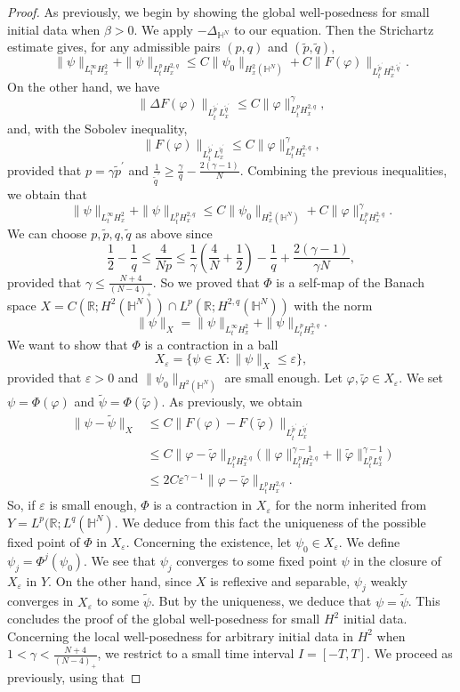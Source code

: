 \documentclass[10pt,leqno]{amsart}
\numberwithin{equation}{section}
\newcommand{\field}[1]{\mathbb{#1}}
\newcommand{\R}{\field{R}}          		%
\newcommand{\Hy}{\field{H}}
\begin{document}
\begin{proof}
As previously, we begin by showing the global well-posedness for small initial data when $\beta >0$. We apply $-\Delta_{\Hy^N}$ to our equation. Then the Strichartz estimate gives, for any admissible pairs $(p,q)$ and $(\tilde{p},\tilde{q})$,
$$\|\psi\|_{L_t^\infty H_x^2} +\|\psi \|_{L_t^p H_x^{2,q}}\leq C \|\psi_0 \|_{H^2_x (\Hy^N)}+C \|F(\varphi)\|_{L_t^{\tilde{p}^\prime} H_x^{2,\tilde{q}^\prime}}.  $$
On the other hand, we have
$$\|\Delta F(\varphi) \|_{L_t^{\tilde{p}^\prime} L_x^{\tilde{q}^\prime}} \leq C \|\varphi \|^\gamma_{L_t^p H_x^{2,q}},$$
and, with the Sobolev inequality,
$$ \| F(\varphi) \|_{L_t^{\tilde{p}^\prime} L_x^{\tilde{q}^\prime}} \leq C \|\varphi \|^\gamma_{L_t^p H_x^{2,q}},$$
provided that $p=\gamma \tilde{p}^\prime$ and $\frac{1}{\tilde{q}^\prime}\geq \frac{\gamma}{q} - \frac{2(\gamma -1)}{N}$. Combining the previous inequalities, we obtain that
$$\|\psi\|_{L_t^\infty H_x^2} +\|\psi \|_{L_t^p H_x^{2,q}}\leq C \|\psi_0\|_{H^2_x (\Hy^N)}+C \|\varphi\|^\gamma_{L_t^p H_x^{2,q}}.$$
We can choose $p,\tilde{p},q,\tilde{q}$ as above since
$$\dfrac{1}{2}- \dfrac{1}{q} \leq \dfrac{4}{Np}\leq \dfrac{1}{\gamma} (\dfrac{4}{N}+\dfrac{1}{2}) - \dfrac{1}{q} +\dfrac{2(\gamma -1)}{\gamma N}, $$
provided that $\gamma \leq \tfrac{N+4}{(N-4)_+}$. So we proved that $\Phi$ is a self-map of the Banach space $X=C(\R ;H^2 (\Hy^N))\cap L^p (\R ; H^{2,q} (\Hy^N))$ %
with the norm 
$$\|\psi\|_X =\|\psi\|_{L_t^\infty H_x^2 } +\|\psi\|_{L_t^p H_x^{2,q}} .$$ 
We want to show that $\Phi$ is a contraction in a ball
$$X_\varepsilon = \{\psi\in X\colon \|\psi\|_X \leq \varepsilon \},$$
provided that $\varepsilon>0$ and $\|\psi_0\|_{H^2 (\Hy^N)}$ are small enough. Let $\varphi,\tilde{\varphi} \in X_\varepsilon$. We set $\psi=\Phi(\varphi)$ and $\tilde{\psi}=\Phi (\tilde{\varphi})$. As previously, we obtain
\begin{align*}
\|\psi-\tilde{\psi}\|_X &\leq C  \|F(\varphi)- F(\tilde{\varphi})\|_{L_t^{\tilde{p}^\prime} L_x^{\tilde{q}^\prime}}\\
&\leq C \|\varphi-\tilde{\varphi}\|_{L_t^p H_x^{2,q}} \big(\|\varphi\|^{\gamma-1}_{L_t^p H_x^{2,q}}+\|\tilde{\varphi}\|^{\gamma-1}_{L_t^p L_x^q} \big)\\
&\leq 2C \varepsilon^{\gamma -1} \|\varphi-\tilde{\varphi}\|_{L_t^p H_x^{2,q}}.
\end{align*}
So, if $\varepsilon$ is small enough, $\Phi$ is a contraction in $X_\varepsilon$ for the norm inherited from $Y=L^p (\R; L^q (\Hy^N)$. We deduce from this fact the uniqueness of the possible fixed point of $\Phi$ in $X_\varepsilon$. Concerning the existence, let $\psi_0 \in X_\varepsilon$. We define $\psi_j=\Phi^j (\psi_0)$. We see that $\psi_j$ converges to some fixed point $\psi$ in the closure of $X_\varepsilon$ in $Y$. On the other hand, since $X$ is reflexive and separable, $\psi_j$ weakly converges in $X_\varepsilon$ to some $\tilde{\psi}$. But by the uniqueness, we deduce that $\psi=\tilde{\psi}$. This concludes the proof of the global well-posedness for small $H^2$ initial data. Concerning the local well-posedness for arbitrary initial data in $H^2$ when $1<\gamma<\frac{N+4}{(N-4)_+}$, we restrict to a small time interval $I=[-T,T]$. We proceed as previously, using that

\end{proof}
\end{document}
